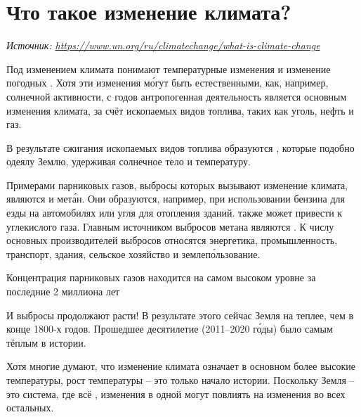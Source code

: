 \section{Что такое изменение климата?}
\textit{Источник: \url{https://www.un.org/ru/climatechange/what-is-climate-change}}

Под изменением климата понимают  температурные изменения и изменение погодных . Хотя эти изменения м\'{о}гут быть естественными, как, например,   солнечной активности, с  годов антропогенная деятельность является основным  изменения климата,  за счёт  ископаемых видов топлива, таких как уголь, нефть и газ.

В результате сжигания ископаемых видов топлива образуются  , которые подобно одеялу  Землю, удерживая солнечное тело и  температуру.

Примерами парниковых газов, выбросы которых вызывают изменение климата, являются  и мет\'{а}н. Они образуются, например, при использовании бензина для езды на автомобилях или угля для отопления зданий.  также может привести к  углекислого газа.
Главным источником выбросов метана являются .
К числу основных производителей выбросов относятся энергетика, промышленность, транспорт, здания, сельское хозяйство и землеп\'{о}льзование.

\begin{fancyquotes}
    Концентрация парниковых газов находится на самом высоком уровне за последние 2 миллиона лет
\end{fancyquotes}

И выбросы продолжают расти! В результате этого сейчас Земля на  теплее, чем в конце 1800-х годов. Прошедшее десятилетие (2011–2020 г\'{о}ды) было самым тёплым в истории.

Хотя многие думают, что изменение климата означает в основном более высокие температуры, рост температуры -- это только начало истории. Поскольку Земля -- это система, где всё , изменения в одной  могут повлиять на изменения во всех остальных.

